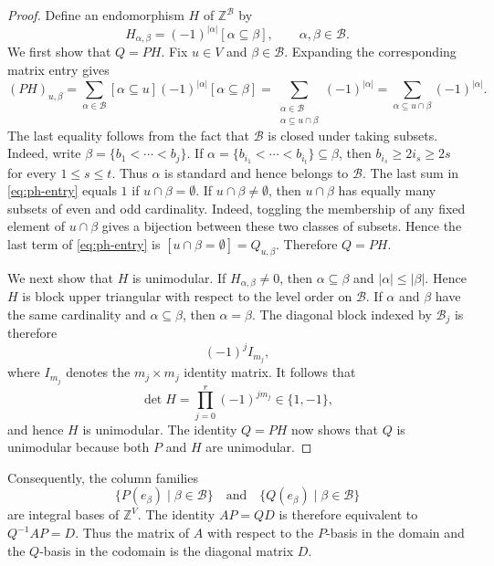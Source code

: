 \documentclass[11pt,reqno]{amsart}
\theoremstyle{plain}
\theoremstyle{definition}
\theoremstyle{remark}
\begin{document}
\begin{proof}
Define an endomorphism $H$ of $\mathbb Z^{\mathcal B}$ by
\[
  H_{\alpha,\beta}
  =(-1)^{|\alpha|}[\alpha\subseteq\beta],
  \qquad \alpha,\beta\in\mathcal B.
\]
We first show that $Q=PH$.
Fix $u\in V$ and $\beta\in\mathcal B$. Expanding the corresponding matrix
entry gives
\begin{equation}\label{eq:ph-entry}
  (PH)_{u,\beta}
  =
  \sum_{\alpha\in\mathcal B}
  [\alpha\subseteq u](-1)^{|\alpha|}[\alpha\subseteq\beta]
  =
  \sum_{\substack{\alpha\in\mathcal B\\
                   \alpha\subseteq u\cap\beta}}
  (-1)^{|\alpha|}
  =
  \sum_{\alpha\subseteq u\cap\beta}
  (-1)^{|\alpha|}.
\end{equation}
The last equality follows from the fact that $\mathcal B$ is closed under
taking subsets. Indeed, write $\beta=\{b_1<\cdots<b_j\}$. If
$\alpha=\{b_{i_1}<\cdots<b_{i_t}\}\subseteq\beta$, then
$b_{i_s}\ge2i_s\ge2s$ for every $1\le s\le t$. Thus $\alpha$ is
standard and hence belongs to $\mathcal B$. The last sum in
\eqref{eq:ph-entry} equals $1$ if $u\cap\beta=\emptyset$. If
$u\cap\beta\ne\emptyset$, then $u\cap\beta$ has equally many subsets of even
and odd cardinality. Indeed, toggling the membership of any fixed element of
$u\cap\beta$ gives a bijection between these two classes of subsets. Hence
the last term of \eqref{eq:ph-entry} is $
  [u\cap\beta=\emptyset]
  =Q_{u,\beta}.
$
Therefore $Q=PH$.

We next show that $H$ is unimodular. If
$H_{\alpha,\beta}\ne0$, then $\alpha\subseteq\beta$ and
$|\alpha|\le|\beta|$. Hence $H$ is block upper triangular with respect to the
level order on $\mathcal B$. If $\alpha$ and $\beta$ have the same
cardinality and $\alpha\subseteq\beta$, then $\alpha=\beta$. The diagonal
block indexed by $\mathcal B_j$ is therefore
\[
  (-1)^jI_{m_j},
\]
where $I_{m_j}$ denotes the $m_j\times m_j$ identity matrix.
It follows that
\[
  \det H=\prod_{j=0}^r(-1)^{j m_j}\in\{1,-1\},
\]
and hence $H$ is unimodular. The identity
$Q=PH$ now shows that $Q$ is unimodular
because both $P$ and $H$ are unimodular.
\end{proof}

Consequently, the column families
\[
  \{P(e_\beta)\mid\beta\in\mathcal B\}
  \quad\text{and}\quad
  \{Q(e_\beta)\mid\beta\in\mathcal B\}
\]
are integral bases of $\mathbb Z^V$. The identity $AP=QD$ is therefore
equivalent to $Q^{-1}AP=D$. Thus the matrix of $A$ with respect to the
$P$-basis in the domain and the $Q$-basis in the codomain is the diagonal
matrix $D$.
\end{document}

